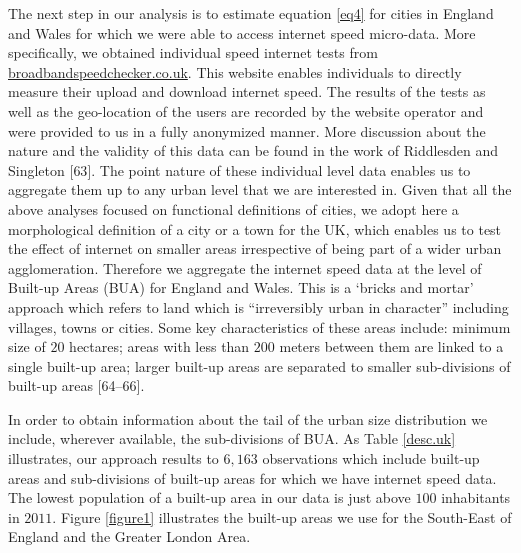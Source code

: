 \documentclass[10pt,letterpaper]{article}
\begin{document}
The next step in our analysis is to estimate equation \ref{eq4} for
cities in England and Wales for which we were able to access internet
speed micro-data. More specifically, we obtained individual speed
internet tests from \url{broadbandspeedchecker.co.uk}. This website
enables individuals to directly measure their upload and download
internet speed. The results of the tests as well as the geo-location of
the users are recorded by the website operator and were provided to us
in a fully anonymized manner. More discussion about the nature and the
validity of this data can be found in the work of Riddlesden and
Singleton {[}63{]}. The point nature of these individual level data
enables us to aggregate them up to any urban level that we are
interested in. Given that all the above analyses focused on functional
definitions of cities, we adopt here a morphological definition of a
city or a town for the UK, which enables us to test the effect of
internet on smaller areas irrespective of being part of a wider urban
agglomeration. Therefore we aggregate the internet speed data at the
level of Built-up Areas (BUA) for England and Wales. This is a `bricks
and mortar' approach which refers to land which is ``irreversibly urban
in character'' including villages, towns or cities. Some key
characteristics of these areas include: minimum size of \(20\) hectares;
areas with less than \(200\) meters between them are linked to a single
built-up area; larger built-up areas are separated to smaller
sub-divisions of built-up areas {[}64--66{]}.

In order to obtain information about the tail of the urban size
distribution we include, wherever available, the sub-divisions of BUA.
As Table \ref{desc.uk} illustrates, our approach results to \(6,163\)
observations which include built-up areas and sub-divisions of built-up
areas for which we have internet speed data. The lowest population of a
built-up area in our data is just above \(100\) inhabitants in \(2011\).
Figure \ref{figure1} illustrates the built-up areas we use for the
South-East of England and the Greater London Area.
\end{document}
